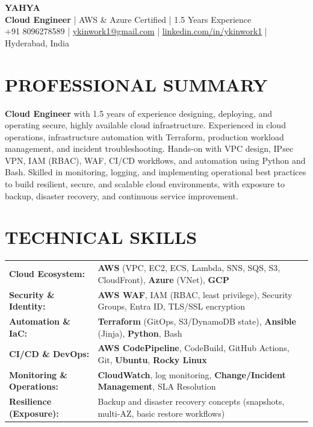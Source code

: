 \documentclass[10pt,a4paper]{article}
\begin{document}
\pagestyle{empty}
\color{textmain}

\begin{center}
    {\Huge \textbf{\color{textdark} YAHYA}}\\[0.1ex]
    \textbf{\color{teal} Cloud Engineer} | AWS \& Azure Certified | 1.5 Years Experience\\[0.1ex]
    +91 8096278589 \quad|\quad 
    \href{mailto:ykinwork1@gmail.com}{ykinwork1@gmail.com} \quad|\quad 
    \href{https://linkedin.com/in/ykinwork1}{linkedin.com/in/ykinwork1} \quad|\quad 
    Hyderabad, India
\end{center}

\vspace{-2ex}
\section*{PROFESSIONAL SUMMARY}
\textbf{Cloud Engineer} with 1.5 years of experience designing, deploying, and operating secure, highly available cloud infrastructure. Experienced in cloud operations, infrastructure automation with Terraform, production workload management, and incident troubleshooting. Hands-on with VPC design, IPsec VPN, IAM (RBAC), WAF, CI/CD workflows, and automation using Python and Bash. Skilled in monitoring, logging, and implementing operational best practices to build resilient, secure, and scalable cloud environments, with exposure to backup, disaster recovery, and continuous service improvement.

\section*{TECHNICAL SKILLS}
\renewcommand{\arraystretch}{1.4}
\begin{tabularx}{\textwidth}{@{}l X@{}}
    \textbf{Cloud Ecosystem:} & \textbf{AWS} (VPC, EC2, ECS, Lambda, SNS, SQS, S3, CloudFront), \textbf{Azure} (VNet), \textbf{GCP} \\
    \textbf{Security \& Identity:} & \textbf{AWS WAF}, IAM (RBAC, least privilege), Security Groups, Entra ID, TLS/SSL encryption \\
    \textbf{Automation \& IaC:} & \textbf{Terraform} (GitOps, S3/DynamoDB state), \textbf{Ansible} (Jinja), \textbf{Python}, Bash \\
    \textbf{CI/CD \& DevOps:} & \textbf{AWS CodePipeline}, CodeBuild, GitHub Actions, Git, \textbf{Ubuntu}, \textbf{Rocky Linux} \\
    \textbf{Monitoring \& Operations:} & \textbf{CloudWatch}, log monitoring, \textbf{Change/Incident Management}, SLA Resolution \\
    \textbf{Resilience (Exposure):} & Backup and disaster recovery concepts (snapshots, multi-AZ, basic restore workflows)
\end{tabularx}
\end{document}
